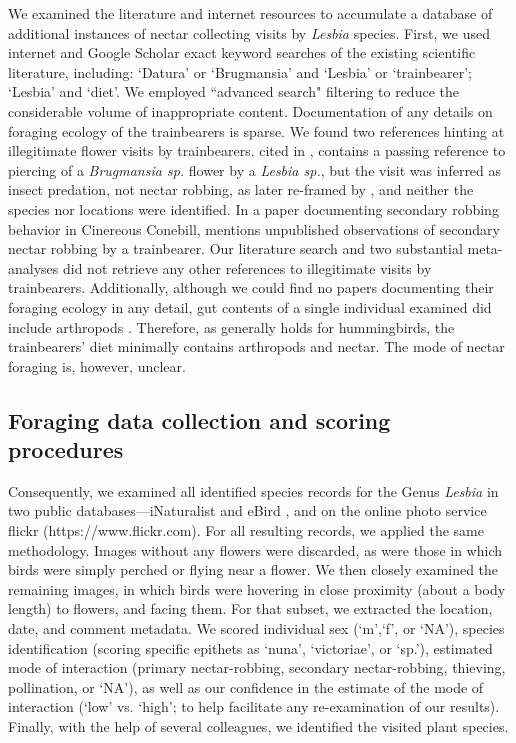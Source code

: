 \documentclass[fleqn,10pt,lineno]{wlpeerj}
\begin{document}
We examined the literature and internet resources to accumulate a database of additional instances of nectar collecting visits by \textit{Lesbia} species. 
First, we used internet and Google Scholar exact keyword searches of the existing scientific literature, including: `Datura' or `Brugmansia' and `Lesbia' or `trainbearer'; `Lesbia' and  `diet'. 
We employed ``advanced search" filtering to reduce the considerable volume of inappropriate content.
Documentation of any details on foraging ecology of the trainbearers is sparse. 
We found two references hinting at illegitimate flower visits by trainbearers. \citet[p.15]{gould1861} cited in \citet{ornelas1994}, contains a passing reference to piercing of a \textit{Brugmansia sp.} flower by a \textit{Lesbia sp.}, but the visit was inferred as insect predation, not nectar robbing, as later re-framed by \citet{ornelas1994}, and neither the species nor locations were identified. 
In a paper documenting secondary robbing behavior in Cinereous Conebill, \citet{vogt2006} mentions unpublished observations of secondary nectar robbing by a trainbearer. %
Our literature search and two substantial meta-analyses \citep{ornelas1994,irwin2010} did not retrieve any other references to illegitimate visits by trainbearers. 
Additionally, although we could find no papers documenting their foraging ecology in any detail, gut contents of a single individual examined did include arthropods \citep{remsen1986}. 
Therefore, as generally holds for hummingbirds, the trainbearers' diet minimally contains arthropods and nectar. 
The mode of nectar foraging is, however, unclear. 

\subsection*{Foraging data collection and scoring procedures}

Consequently, we examined all identified species records for the Genus \textit{Lesbia} in two public databases---iNaturalist \citep{inaturalist} and eBird \citep{ebird}, and on the online photo service flickr (https://www.flickr.com). 
For all resulting records, we applied the same methodology. 
Images without any flowers were discarded, as were those in which birds were simply perched or flying near a flower.
We then closely examined the remaining images, in which birds were hovering in close proximity (about a body length) to flowers, and facing them. 
For that subset, we extracted the location, date, and comment metadata. 
We scored individual sex (`m',`f', or `NA'), species identification (scoring specific epithets as `nuna', `victoriae', or `sp.'), estimated mode of interaction (primary nectar-robbing, secondary nectar-robbing, thieving, pollination, or `NA'), as well as our confidence in the estimate of the mode of interaction (`low' vs. `high'; to help facilitate any re-examination of our results). 
Finally, with the help of several colleagues, we identified the visited plant species. 
\end{document}
